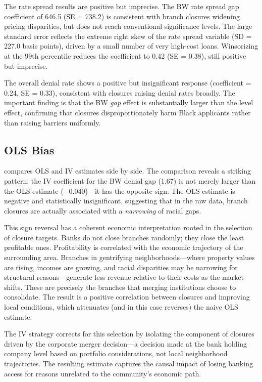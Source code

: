 \documentclass[12pt]{article}
\begin{document}
The rate spread results are positive but imprecise. The BW rate spread gap coefficient of 646.5 (SE = 738.2) is consistent with branch closures widening pricing disparities, but does not reach conventional significance levels. The large standard error reflects the extreme right skew of the rate spread variable (SD = 227.0 basis points), driven by a small number of very high-cost loans. Winsorizing at the 99th percentile reduces the coefficient to 0.42 (SE = 0.38), still positive but imprecise.

The overall denial rate shows a positive but insignificant response (coefficient = 0.24, SE = 0.33), consistent with closures raising denial rates broadly. The important finding is that the BW \emph{gap} effect is substantially larger than the level effect, confirming that closures disproportionately harm Black applicants rather than raising barriers uniformly.



\subsection{OLS Bias}

 compares OLS and IV estimates side by side. The comparison reveals a striking pattern: the IV coefficient for the BW denial gap (1.67) is not merely larger than the OLS estimate ($-0.040$)---it has the opposite sign. The OLS estimate is negative and statistically insignificant, suggesting that in the raw data, branch closures are actually associated with a \emph{narrowing} of racial gaps.

This sign reversal has a coherent economic interpretation rooted in the selection of closure targets. Banks do not close branches randomly; they close the least profitable ones. Profitability is correlated with the economic trajectory of the surrounding area. Branches in gentrifying neighborhoods---where property values are rising, incomes are growing, and racial disparities may be narrowing for structural reasons---generate less revenue relative to their costs as the market shifts. These are precisely the branches that merging institutions choose to consolidate. The result is a positive correlation between closures and improving local conditions, which attenuates (and in this case reverses) the naive OLS estimate.

The IV strategy corrects for this selection by isolating the component of closures driven by the corporate merger decision---a decision made at the bank holding company level based on portfolio considerations, not local neighborhood trajectories. The resulting estimate captures the causal impact of losing banking access for reasons unrelated to the community's economic path.
\end{document}
